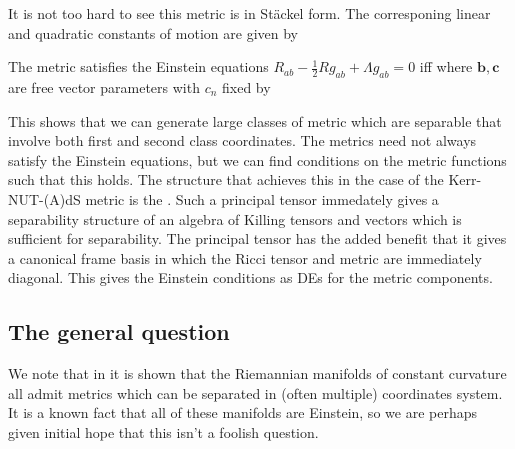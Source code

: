 \documentclass{article}
\begin{document}
It is not too hard to see this metric is in St\"ackel form. The corresponing linear and quadratic constants of motion are given by 

\begin{prop}
	The metric satisfies the Einstein equations $R_{ab} - \frac{1}{2}R g_{ab} + \Lambda g_{ab} =0$ iff 
where $\bm{b},\bm{c}$ are free vector parameters with $c_n$ fixed by 
\end{prop}

This shows that we can generate large classes of metric which are separable that involve both first and second class coordinates. The metrics need not always satisfy the Einstein equations, but we can find conditions on the metric functions such that this holds. The structure that achieves this in the case of the Kerr-NUT-(A)dS metric is the . Such a principal tensor immedately gives a separability structure of an algebra of Killing tensors and vectors which is sufficient for separability. The principal tensor has the added benefit that it gives a canonical frame basis in which the Ricci tensor and metric are immediately diagonal. This gives the Einstein conditions as DEs for the metric components. 

\subsection{The general question}

\begin{example}
We note that in \cite{Kalnins1986} it is shown that the Riemannian manifolds of constant curvature all admit metrics which can be separated in (often multiple) coordinates system. It is a known fact that all of these manifolds are Einstein, so we are perhaps given initial hope that this isn't a foolish question. 
\end{example}
\end{document}
